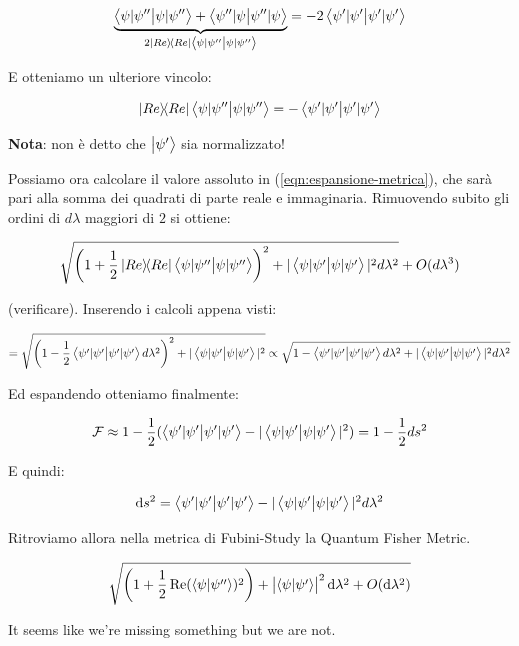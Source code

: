 \documentclass[main.tex]{subfiles}
\begin{document}
\begin{align*}
\underbrace{\braket{\psi|\psi''} + \braket{\psi''|\psi}}_{2\op{Re}\braket{\psi|\psi''}} = -2\braket{\psi'|\psi'}
\end{align*}

E otteniamo un ulteriore vincolo:

\begin{align*}
\op{Re}\braket{\psi|\psi''} = -\braket{\psi'|\psi'}
\end{align*}

\textbf{Nota}: non è detto che $\ket{\psi'}$ sia normalizzato!

Possiamo ora calcolare il valore assoluto in (\ref{eqn:espansione-metrica}), che sarà pari alla somma dei quadrati di parte reale e immaginaria. Rimuovendo subito gli ordini di $d\lambda$ maggiori di $2$ si ottiene:

\begin{align*}
\sqrt{\left(1+\frac{1}{2}\op{Re}\braket{\psi|\psi''}\right)^2 + |\braket{\psi|\psi'}|^2 d\lambda^2} + O(d\lambda^3)
\end{align*}

(verificare). Inserendo i calcoli appena visti:

\begin{align*}
= \sqrt{\left(1-\frac{1}{2}\braket{\psi'|\psi'} d\lambda^2\right)^2 + |\braket{\psi|\psi'}|^2 } \propto \sqrt{1-\braket{\psi'|\psi' }d\lambda^2 + |\braket{\psi|\psi'}|^2 d\lambda^2}
\end{align*}

Ed espandendo otteniamo finalmente:

\begin{align*}
\mathcal{F} \approx 1-\frac{1}{2}(\braket{\psi'|\psi'} - |\braket{\psi|\psi'}|^2) = 1-\frac{1}{2}ds^2
\end{align*}

E quindi:

\begin{align*}
\dd{s^2} = \braket{\psi'|\psi'}-|\braket{\psi|\psi'}|^2 d\lambda^2
\end{align*}

Ritroviamo allora nella metrica di Fubini-Study la Quantum Fisher Metric.

\begin{equation}
  \sqrt{\qty(1+ \frac{1}{2} \Re(\braket{\psi}{\psi''} )^2) + \abs{\braket{\psi}{\psi'} }^2 \dd{\lambda^2} + O(\dd{\lambda^2}) }
\end{equation}

It seems like we're missing something but we are not.
\end{document}
